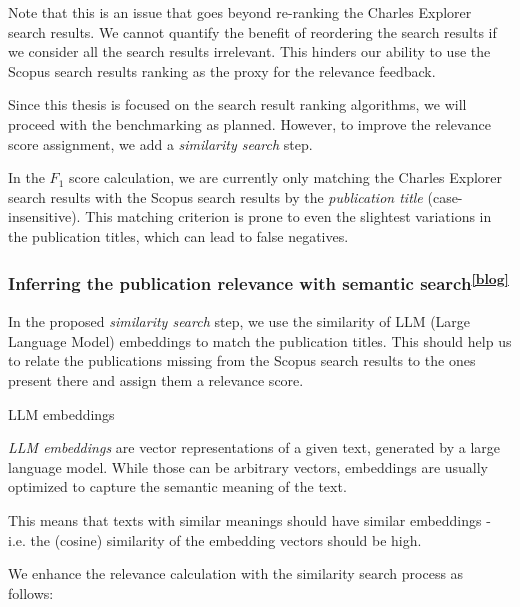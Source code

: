 Note that this is an issue that goes beyond re-ranking the Charles Explorer search results. 
We cannot quantify the benefit of reordering the search results if we consider all the search results irrelevant.
This hinders our ability to use the Scopus search results ranking as the proxy for the relevance feedback.

Since this thesis is focused on the search result ranking algorithms, we will proceed with the benchmarking as planned. 
However, to improve the relevance score assignment, we add a \textit{similarity search} step. 
 
In the $F_1$ score calculation, we are currently only matching the Charles Explorer search results with the Scopus search results by the \textit{publication title} (case-insensitive). 
This matching criterion is prone to even the slightest variations in the publication titles, which can lead to false negatives.

\subsubsection[Inferring the publication relevance with semantic search]{Inferring the publication relevance with semantic search\textsuperscript{\href{https://jindrich.bar/edu/thesis-blog/ndcg-benchmark/\#infering-the-relevance-with-similarity-search}{[blog]}}}\label{semantic-search}

In the proposed \textit{similarity search} step, we use the similarity of LLM (Large Language Model) embeddings to match the publication titles. 
This should help us to relate the publications missing from the Scopus search results to the ones present there and assign them a relevance score.

\begin{mybox}{LLM embeddings}

    \textit{LLM embeddings} are vector representations of a given text, generated by a large language model.
    While those can be arbitrary vectors, embeddings are usually optimized to capture the semantic meaning of the text. 
    
    This means that texts with similar meanings should have similar embeddings - i.e. the (cosine) similarity of the embedding vectors should be high.
\end{mybox}

We enhance the relevance calculation with the similarity search process as follows:

